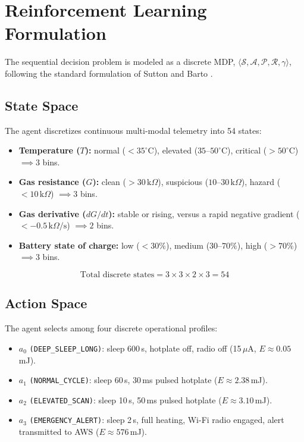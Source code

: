 \documentclass[10pt,twocolumn]{article}
\begin{document}
\section{Reinforcement Learning Formulation}

The sequential decision problem is modeled as a discrete MDP, $\langle \mathcal{S}, \mathcal{A}, \mathcal{P}, \mathcal{R}, \gamma \rangle$, following the standard formulation of Sutton and Barto \cite{b2}.

\subsection{State Space}

The agent discretizes continuous multi-modal telemetry into 54 states:
\begin{itemize}[leftmargin=1.4em]
    \item \textbf{Temperature ($T$):} normal ($<35^\circ$C), elevated ($35$--$50^\circ$C), critical ($>50^\circ$C) $\implies 3$ bins.
    \item \textbf{Gas resistance ($G$):} clean ($>30\,\text{k}\Omega$), suspicious ($10$--$30\,\text{k}\Omega$), hazard ($<10\,\text{k}\Omega$) $\implies 3$ bins.
    \item \textbf{Gas derivative ($dG/dt$):} stable or rising, versus a rapid negative gradient ($<-0.5\,\text{k}\Omega/\text{s}$) $\implies 2$ bins.
    \item \textbf{Battery state of charge:} low ($<30\%$), medium ($30$--$70\%$), high ($>70\%$) $\implies 3$ bins.
\end{itemize}
\[
\text{Total discrete states} = 3 \times 3 \times 2 \times 3 = 54
\]

\subsection{Action Space}

The agent selects among four discrete operational profiles:
\begin{itemize}[leftmargin=1.4em]
    \item $a_0$ \texttt{(DEEP\_SLEEP\_LONG)}: sleep 600\,s, hotplate off, radio off (15\,$\mu$A, $E \approx 0.05$\,mJ).
    \item $a_1$ \texttt{(NORMAL\_CYCLE)}: sleep 60\,s, 30\,ms pulsed hotplate ($E \approx 2.38$\,mJ).
    \item $a_2$ \texttt{(ELEVATED\_SCAN)}: sleep 10\,s, 50\,ms pulsed hotplate ($E \approx 3.10$\,mJ).
    \item $a_3$ \texttt{(EMERGENCY\_ALERT)}: sleep 2\,s, full heating, Wi-Fi radio engaged, alert transmitted to AWS ($E \approx 576$\,mJ).
\end{itemize}
\end{document}
